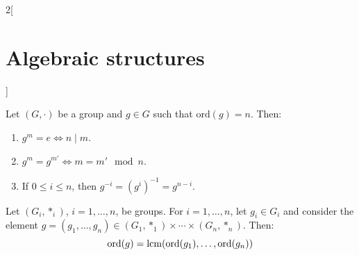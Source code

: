 \documentclass[../../../main.tex]{subfiles}
\begin{document}
\begin{multicols}{2}[\section{Algebraic structures}]
  \begin{lemma}
    Let $(G,\cdot)$ be a group and $g\in G$ such that $\text{ord}(g)=n$. Then:
    \begin{enumerate}
      \item $g^m=e\iff n\mid m$.
      \item $g^m=g^{m'}\iff m=m'\mod{n}$.
      \item If $0\leq i\leq n$, then $g^{-i}=(g^i)^{-1}=g^{n-i}$.
    \end{enumerate}
  \end{lemma}
  \begin{corollary}
    Let $(G_i,*_i)$, $i=1,\ldots, n$, be groups. For $i=1,\ldots,n$, let $g_i\in G_i$ and consider the element $g=(g_1,\ldots,g_n)\in(G_1,*_1)\times\cdots\times(G_n,*_n)$. Then: $$\text{ord}(g)=\operatorname{lcm}(\text{ord}(g_1),\ldots,\text{ord}(g_n))$$
  \end{corollary}

\end{multicols}
\end{document}
